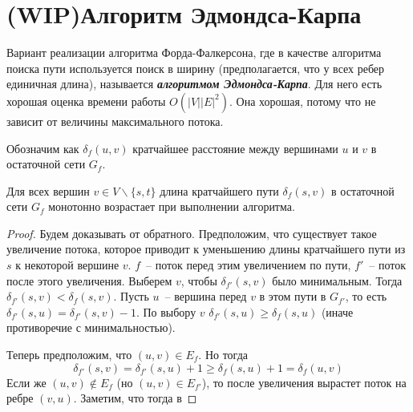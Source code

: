 \let\bf\bfseries
\let\it\itshape
\section{(WIP)Алгоритм Эдмондса-Карпа}\label{edmonds_karp}
Вариант реализации алгоритма Форда-Фалкерсона, где в качестве алгоритма поиска пути используется поиск в ширину (предполагается, что у всех ребер единичная длина), называется {\bf\it алгоритмом Эдмондса-Карпа}. Для него есть хорошая оценка времени работы $O(|V||E|^2)$. Она хорошая, потому что не зависит от величины максимального потока.

Обозначим как $\delta_f(u,v)$ кратчайшее расстояние между вершинами $u$ и $v$ в остаточной сети $G_f$.
\begin{lemma}
	Для всех вершин $v\in V\smallsetminus\{s,t\}$ длина кратчайшего пути $\delta_f(s,v)$ в остаточной сети $G_f$ монотонно возрастает при выполнении алгоритма.
\end{lemma}
\begin{proof}
	Будем доказывать от обратного. Предположим, что существует такое увеличение потока, которое приводит к уменьшению длины кратчайшего пути из $s$ к некоторой вершине $v$. $f$~-- поток перед этим увеличением по пути, $f'$~-- поток после этого увеличения. Выберем $v$, чтобы $\delta_{f'}(s,v)$ было минимальным. Тогда $\delta_{f'}(s,v)<\delta_f(s,v)$. Пусть $u$~-- вершина перед $v$ в этом пути в $G_{f'}$, то есть $\delta_{f'}(s,u)=\delta_{f'}(s,v)-1$. По выбору $v$ $\delta_{f'}(s,u)\ge\delta_f(s,u)$ (иначе противоречие с минимальностью). 
	
	Теперь предположим, что $(u,v)\in E_f$. Но тогда $$\delta_{f'}(s,v)=\delta_{f'}(s,u)+1\ge\delta_f(s,u)+1=\delta_f(u,v)$$
	Если же $(u,v)\not\in E_f$ (но $(u,v)\in E_{f'}$), то после увеличения вырастет поток на ребре $(v,u)$. Заметим, что тогда в 
\end{proof}

